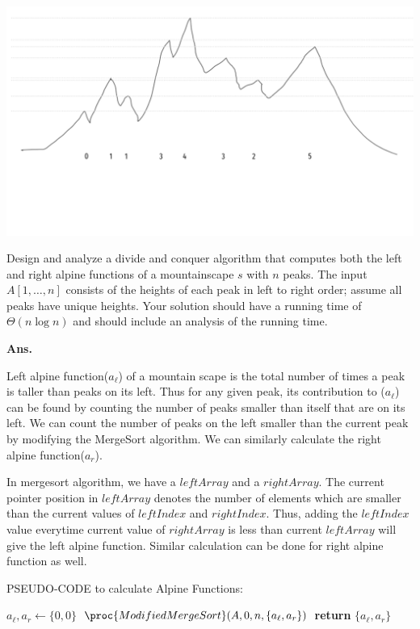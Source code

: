 \documentclass[11pt]{article}
\begin{document}
\begin{center}\includegraphics[scale=0.2]{mountains}\end{center}

Design and analyze a divide and conquer algorithm that computes both the left and right alpine functions of a mountainscape $s$ with $n$ peaks. The input $A[1,\ldots, n]$ consists of the heights of each peak in left to right order; assume all peaks have unique heights. Your solution should have a running time of $\Theta(n \log n)$ and should include an analysis of the running time.


\hfill
   
\noindent \textbf{Ans.}

Left alpine function($a_\ell$) of a mountain scape is the total number of times a peak is taller than peaks on its left. Thus for any given peak, its contribution to ($a_\ell$) can be found by counting the number of peaks smaller than itself that are on its left. We can count the number of peaks on the left smaller than the current peak by modifying the MergeSort algorithm. We can similarly calculate the right alpine function($a_r$).

In mergesort algorithm, we have a $leftArray$ and a $rightArray$. The current pointer position in $leftArray$ denotes the number of elements which are smaller than the current values of $leftIndex$ and $rightIndex$. Thus, adding the $leftIndex$ value everytime current value of $rightArray$ is less than current $leftArray$ will give the left alpine function. Similar calculation can be done for right alpine function as well.

\newpage
\noindent PSEUDO-CODE to calculate Alpine Functions:

    \begin{codebox}
    \li $a_\ell, a_r \leftarrow \{0, 0\}$
    \li $\proc{ModifiedMergeSort}(A, 0, n, \{a_\ell, a_r\})$
    \li \textbf{return} $\{a_\ell, a_r\}$
    \end{codebox}
    
\end{document}
